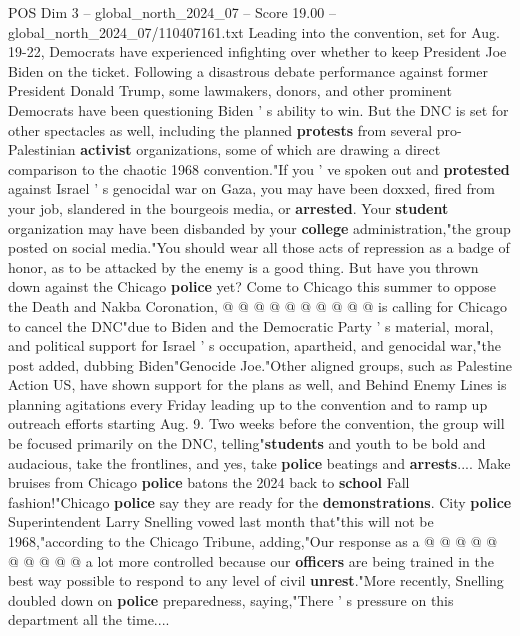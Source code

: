 \begin{textsample}{POS Dim 3 – global\_north\_2024\_07 – Score 19.00 – global\_north\_2024\_07/110407161.txt}  \label{ex:f3_pos_084}
Leading into the convention, set for Aug. 19-22, Democrats have experienced infighting over whether to keep President Joe Biden on the ticket.
Following a disastrous debate performance against former President Donald Trump, some lawmakers, donors, and other prominent Democrats have been questioning Biden ' s ability to win.
But the DNC is set for other spectacles as well, including the planned \textbf{protests} from several pro-Palestinian \textbf{activist} organizations, some of which are drawing a direct comparison to the chaotic 1968 convention."If you ' ve spoken out and \textbf{protested} against Israel ' s genocidal war on Gaza, you may have been doxxed, fired from your job, slandered in the bourgeois media, or \textbf{arrested}.
Your \textbf{student} organization may have been disbanded by your \textbf{college} administration,"the group posted on social media."You should wear all those acts of repression as a badge of honor, as to be attacked by the enemy is a good thing.
But have you thrown down against the Chicago \textbf{police} yet?
Come to Chicago this summer to oppose the Death and Nakba Coronation, @ @ @ @ @ @ @ @ @ @ is calling for Chicago to cancel the DNC"due to Biden and the Democratic Party ' s material, moral, and political support for Israel ' s occupation, apartheid, and genocidal war,"the post added, dubbing Biden"Genocide Joe."Other aligned groups, such as Palestine Action US, have shown support for the plans as well, and Behind Enemy Lines is planning agitations every Friday leading up to the convention and to ramp up outreach efforts starting Aug. 9.
Two weeks before the convention, the group will be focused primarily on the DNC, telling"\textbf{students} and youth to be bold and audacious, take the frontlines, and yes, take \textbf{police} beatings and \textbf{arrests}....
Make bruises from Chicago \textbf{police} batons the 2024 back to \textbf{school} Fall fashion!"Chicago \textbf{police} say they are ready for the \textbf{demonstrations}.
City \textbf{police} Superintendent Larry Snelling vowed last month that"this will not be 1968,"according to the Chicago Tribune, adding,"Our response as a @ @ @ @ @ @ @ @ @ @ a lot more controlled because our \textbf{officers} are being trained in the best way possible to respond to any level of civil \textbf{unrest}."More recently, Snelling doubled down on \textbf{police} preparedness, saying,"There ' s pressure on this department all the time....

\end{textsample}
